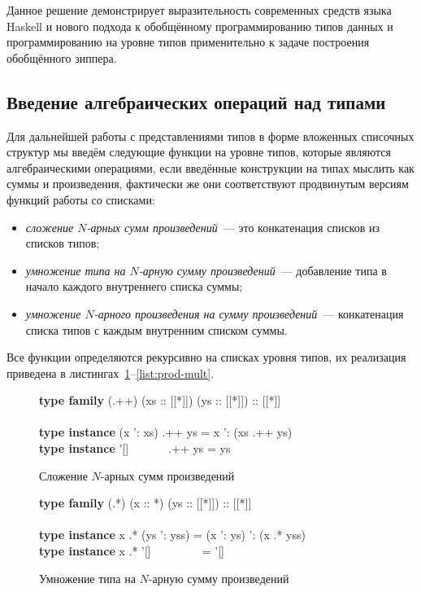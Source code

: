 Данное решение демонстрирует выразительность современных средств языка Haskell и нового подхода к обобщённому программированию типов данных и программированию на уровне типов применительно к задаче построения обобщённого зиппера.

\subsection{Введение алгебраических операций над типами}
Для дальнейшей работы с представлениями типов в форме вложенных списочных структур мы введём следующие функции на уровне типов, которые являются алгебраическими операциями, если введённые конструкции на типах мыслить как суммы и произведения, фактически же они соответствуют продвинутым версиям функций работы со списками:
\begin{itemize}
\item \textsl{сложение $N$-арных сумм произведений}~--- это конкатенация списков из списков типов;
\item \textsl{умножение типа на $N$-арную сумму произведений}~--- добавление типа в начало каждого внутреннего списка суммы;
\item \textsl{умножение $N$-арного произведения на сумму произведений}~--- конкатенация списка типов с каждым внутренним списком суммы.
\end{itemize}

Все функции определяются рекурсивно на списках уровня типов, их реализация приведена в листингах~\ref{list:sums-adding}--\ref{list:prod-mult}.
\begin{figure}[h]
\begin{framed}
\ttfamily\small
\textbf{type family} (.++) (xs :: [[*]]) (ys :: [[*]]) :: [[*]]\\
\\
\textbf{type instance} (x ': xs) .++ ys = x ': (xs .++ ys)\\
\textbf{type instance} '[]~~~~~~~.++ ys = ys
\vspace{-0.25cm}
\end{framed}
\caption{Сложение $N$-арных сумм произведений}
\label{list:sums-adding}
\end{figure}

\begin{figure}[h]
\begin{framed}
\ttfamily\small
\textbf{type family} (.*) (x :: *) (ys :: [[*]]) :: [[*]]\\
\\
\textbf{type instance} x .* (ys ': yss) = (x ': ys) ': (x .* yss)\\
\textbf{type instance} x .* '[]~~~~~~~~~= '[]
\end{framed}
\caption{Умножение типа на $N$-арную сумму произведений}
\label{list:type-mult}
\end{figure}
\newpage

